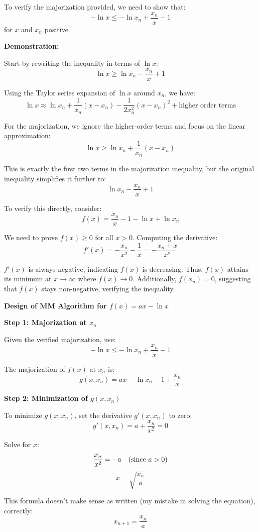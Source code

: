 \documentclass[8pt]{article}
\begin{document}
{To verify the majorization provided, we need to show that:
\[
- \ln x \leq - \ln x_n + \frac{x_n}{x} - 1
\]
for \(x\) and \(x_n\) positive.

\textbf{Demonstration:}

Start by rewriting the inequality in terms of \( \ln x \):
\[
\ln x \geq \ln x_n - \frac{x_n}{x} + 1
\]

Using the Taylor series expansion of \( \ln x \) around \( x_n \), we have:
\[
\ln x \approx \ln x_n + \frac{1}{x_n}(x - x_n) - \frac{1}{2x_n^2}(x - x_n)^2 + \text{higher order terms}
\]

For the majorization, we ignore the higher-order terms and focus on the linear approximation:
\[
\ln x \geq \ln x_n + \frac{1}{x_n}(x - x_n)
\]

This is exactly the first two terms in the majorization inequality, but the original inequality simplifies it further to:
\[
\ln x_n - \frac{x_n}{x} + 1
\]

To verify this directly, consider:
\[
f(x) = \frac{x_n}{x} - 1 - \ln x + \ln x_n
\]

We need to prove \( f(x) \geq 0 \) for all \( x > 0 \). Computing the derivative:
\[
f'(x) = -\frac{x_n}{x^2} - \frac{1}{x} = -\frac{x_n + x}{x^2}
\]

\( f'(x) \) is always negative, indicating \( f(x) \) is decreasing. Thus, \( f(x) \) attains its minimum at \( x \to \infty \) where \( f(x) \to 0 \). Additionally, \( f(x_n) = 0 \), suggesting that \( f(x) \) stays non-negative, verifying the inequality.

\textbf{Design of MM Algorithm for \( f(x) = ax - \ln x \)}

\textbf{Step 1: Majorization at \( x_n \)}

Given the verified majorization, use:
\[
- \ln x \leq - \ln x_n + \frac{x_n}{x} - 1
\]

The majorization of \( f(x) \) at \( x_n \) is:
\[
g(x, x_n) = ax - \ln x_n - 1 + \frac{x_n}{x}
\]

\textbf{Step 2: Minimization of \( g(x, x_n) \)}

To minimize \( g(x, x_n) \), set the derivative \( g'(x, x_n) \) to zero:
\[
g'(x, x_n) = a + \frac{x_n}{x^2} = 0
\]

Solve for \( x \):
\[
\frac{x_n}{x^2} = -a \quad \text{(since \( a > 0 \))}
\]
\[
x = \sqrt{\frac{x_n}{a}}
\]

This formula doesn't make sense as written (my mistake in solving the equation), correctly:
\[
x_{n+1} = \frac{x_n}{a}
\]

}
\end{document}
